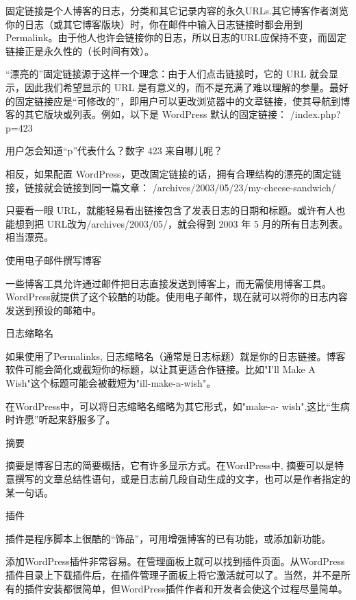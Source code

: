 \begin{compactitem}
固定链接是个人博客的日志，分类和其它记录内容的永久URLs.其它博客作者浏览你的日志（或其它博客版块）时，你在邮件中输入日志链接时都会用到Permalink。由于他人也许会链接你的日志，所以日志的URL应保持不变，而固定链接正是永久性的（长时间有效）。

“漂亮的”固定链接源于这样一个理念：由于人们点击链接时，它的 URL 就会显示，因此我们希望显示的 URL 是有意义的，而不是充满了难以理解的参量。最好的固定链接应是“可修改的”，即用户可以更改浏览器中的文章链接，使其导航到博客的其它版块或列表。例如，以下是 WordPress 默认的固定链接： /index.php?p=423

用户怎会知道“p”代表什么？数字 423 来自哪儿呢？

相反，如果配置 WordPress，更改固定链接的话，拥有合理结构的漂亮的固定链接，链接就会链接到同一篇文章： /archives/2003/05/23/my-cheese-sandwich/

只要看一眼 URL，就能轻易看出链接包含了发表日志的日期和标题。或许有人也能想到把 URL改为/archives/2003/05/，就会得到 2003 年 5 月的所有日志列表。相当漂亮。

\item 使用电子邮件撰写博客

一些博客工具允许通过邮件把日志直接发送到博客上，而无需使用博客工具。WordPress就提供了这个较酷的功能。使用电子邮件，现在就可以将你的日志内容发送到预设的邮箱中。

\item 日志缩略名

如果使用了Permalinks, 日志缩略名（通常是日志标题）就是你的日志链接。博客软件可能会简化或截短你的标题，以让其更适合作链接。比如"I'll Make A Wish"这个标题可能会被截短为"ill-make-a-wish"。

在WordPress中，可以将日志缩略名缩略为其它形式，如"make-a- wish",这比“生病时许愿”听起来舒服多了。

\item 摘要

摘要是博客日志的简要概括，它有许多显示方式。在WordPress中, 摘要可以是特意撰写的文章总结性语句，或是日志前几段自动生成的文字，也可以是作者指定的某一句话。

\item 插件

插件是程序脚本上很酷的“饰品”，可用增强博客的已有功能，或添加新功能。

添加WordPress插件非常容易。在管理面板上就可以找到插件页面。从WordPress插件目录上下载插件后，在插件管理子面板上将它激活就可以了。当然，并不是所有的插件安装都很简单，但WordPress插件作者和开发者会使这个过程尽量简单。

\end{compactitem}

